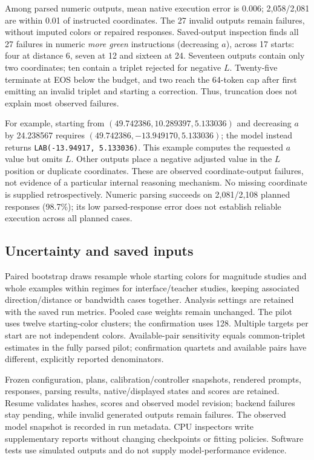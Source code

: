 Among parsed numeric outputs, mean native execution error is 0.006;
2{,}058/2{,}081 are within 0.01 of instructed coordinates.
The 27 invalid outputs remain failures, without imputed colors or repaired
responses. Saved-output inspection finds all 27 failures in numeric
\textit{more green} instructions (decreasing $a$), across 17 starts:
four at distance 6, seven at 12 and sixteen at 24. Seventeen outputs
contain only two coordinates; ten contain a triplet rejected for negative
$L$. Twenty-five terminate at EOS below the budget, and two reach the
64-token cap after first emitting an invalid triplet and starting a correction.
Thus, truncation does not explain most observed failures.

For example, starting from $(49.742386,10.289397,5.133036)$ and decreasing
$a$ by 24.238567 requires $(49.742386,-13.949170,5.133036)$;
the model instead returns \texttt{LAB(-13.94917, 5.133036)}.
This example computes the requested $a$ value but omits $L$.
Other outputs place a negative adjusted value in the $L$ position or
duplicate coordinates. These are observed coordinate-output failures,
not evidence of a particular internal reasoning mechanism. No missing
coordinate is supplied retrospectively. Numeric parsing succeeds on
2{,}081/2{,}108 planned responses (98.7\%); its low parsed-response error
does not establish reliable execution across all planned cases.

\subsection{Uncertainty and saved inputs}
Paired bootstrap draws resample whole starting colors for magnitude studies
and whole examples within regimes for interface/teacher studies, keeping
associated direction/distance or bandwidth cases together. Analysis settings
are retained with the saved run metrics. Pooled case weights remain unchanged. The pilot
uses twelve starting-color clusters; the confirmation uses 128. Multiple
targets per start are not independent colors. Available-pair sensitivity
equals common-triplet estimates in the fully parsed pilot; confirmation
quartets and available pairs have different, explicitly reported denominators.

Frozen configuration, plans, calibration/controller snapshots, rendered
prompts, responses, parsing results, native/displayed states and scores are
retained. Resume validates hashes, scores and observed model revision; backend
failures stay pending, while invalid generated outputs remain failures.
The observed model snapshot is recorded in run metadata. CPU inspectors
write supplementary reports without changing checkpoints or fitting policies.
Software tests use simulated outputs and do not supply model-performance evidence.

